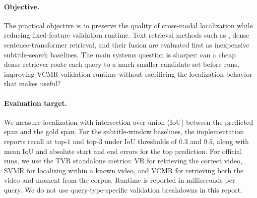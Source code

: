 \paragraph{Objective.}
The practical objective is to preserve the quality of cross-modal localization while reducing fixed-feature validation runtime. Text retrieval methods such as \bm, dense sentence-transformer retrieval, and their fusion are evaluated first as inexpensive subtitle-search baselines. The main systems question is sharper: can a cheap dense retriever route each query to a much smaller candidate set before \xml runs, improving VCMR validation runtime without sacrificing the localization behavior that makes \xml useful?

\paragraph{Evaluation target.}
We measure localization with intersection-over-union (IoU) between the predicted span and the gold span. For the subtitle-window baselines, the implementation reports recall at top-$1$ and top-$3$ under IoU thresholds of $0.3$ and $0.5$, along with mean IoU and absolute start and end errors for the top prediction. For official \xml runs, we use the TVR standalone metrics: VR for retrieving the correct video, SVMR for localizing within a known video, and VCMR for retrieving both the video and moment from the corpus. Runtime is reported in milliseconds per query. We do not use query-type-specific validation breakdowns in this report.
